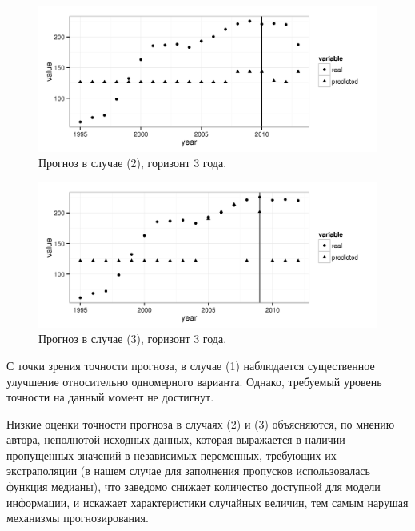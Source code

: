 \documentclass[a4paper,14pt]{article}
\begin{document}
\begin{figure}[bhtp]
    \begin{center}
        \includegraphics{images/m_plot2.png}
        \caption{Прогноз в случае (2), горизонт 3 года.}		
        \label{figure:m_plot2}
    \end{center}
\end{figure}

\begin{figure}[bhtp]
    \begin{center}
        \includegraphics{images/m_plot3.png}
        \caption{Прогноз в случае (3), горизонт 3 года.}		
        \label{figure:m_plot3}
    \end{center}
\end{figure}

С точки зрения точности прогноза, в случае (1) наблюдается существенное 
улучшение относительно одномерного варианта. 
Однако, требуемый уровень точности на данный момент не 
достигнут.

Низкие оценки точности прогноза в случаях (2) и (3) объясняются, по мнению 
автора, неполнотой исходных данных, которая выражается в наличии пропущенных 
значений в независимых переменных, требующих их экстраполяции (в нашем случае 
для заполнения пропусков использовалась функция медианы), что заведомо снижает 
количество доступной для модели информации, и искажает характеристики случайных 
величин, тем самым нарушая механизмы прогнозирования.
\end{document}
